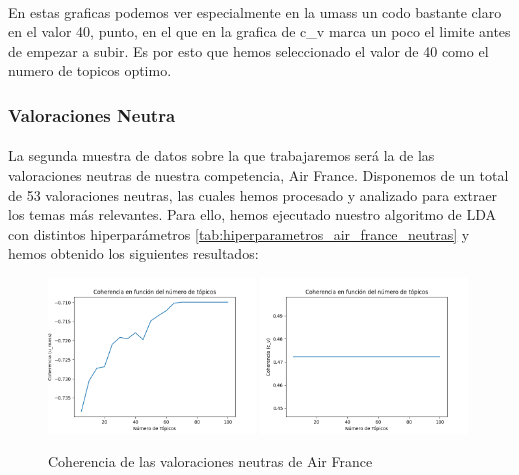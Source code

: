 \documentclass{report}
\begin{document}
{                    \paragraph*{}
                    {
                        En estas graficas podemos ver especialmente en la umass un codo bastante claro en el valor 40, punto, en el que en la grafica de c\_v marca un poco el limite antes de empezar a subir.
                        Es por esto que hemos seleccionado el valor de 40 como el numero de topicos optimo.
                    }
                \clearpage\subsubsection*{Valoraciones Neutra}
                    \paragraph*{}{
                        La segunda muestra de datos sobre la que trabajaremos será la de las valoraciones neutras de nuestra competencia, Air France.
                        Disponemos de un total de 53 valoraciones neutras, las cuales hemos procesado y analizado para extraer los temas más relevantes.
                        Para ello, hemos ejecutado nuestro algoritmo de LDA con distintos hiperparámetros \ref{tab:hiperparametros_air_france_neutras} y hemos obtenido los siguientes resultados:
                    }
                    \begin{figure}[H]
                        \centering
                        \includegraphics[width=0.49\textwidth]{./img/air_france_neutras_umass.png}
                        \includegraphics[width=0.49\textwidth]{./img/air_france_neutras_cv.png}
                        \caption{Coherencia de las valoraciones neutras de Air France}
                    \end{figure}
}
\end{document}

